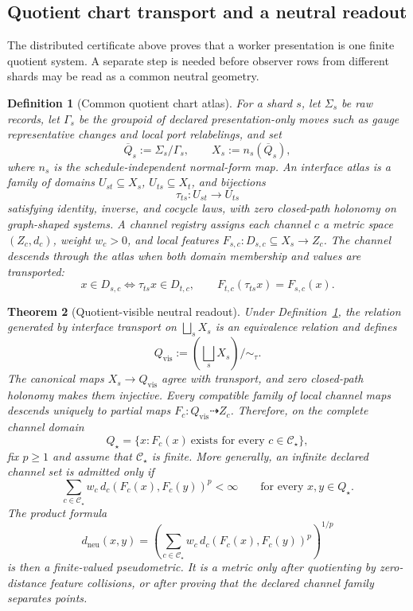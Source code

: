 \documentclass[11pt]{article}
\newtheorem{theorem}{Theorem}[section]
\newtheorem{definition}[theorem]{Definition}
\theoremstyle{remark}
\theoremstyle{plain}
\begin{document}
\subsection{Quotient chart transport and a neutral readout}
\label{sec:quotient-neutral-geometry}

The distributed certificate above proves that a worker presentation is one finite quotient
system. A separate step is needed before observer rows from different shards may be read as a
common neutral geometry.

\begin{definition}[Common quotient chart atlas]\label{def:neutral-quotient-atlas-consensus}
For a shard \(s\), let \(\Sigma_s\) be raw records, let \(\Gamma_s\) be the groupoid of declared
presentation-only moves such as gauge representative changes and local port relabelings, and set
\[
\overline Q_s:=\Sigma_s/\Gamma_s,\qquad X_s:=n_s(\overline Q_s),
\]
where \(n_s\) is the schedule-independent normal-form map. An interface atlas is a family of
domains \(U_{st}\subseteq X_s\), \(U_{ts}\subseteq X_t\), and bijections
\[
\tau_{ts}:U_{st}\to U_{ts}
\]
satisfying identity, inverse, and cocycle laws, with zero closed-path holonomy on graph-shaped
systems. A channel registry assigns each channel \(c\) a metric space \((Z_c,d_c)\), weight
\(w_c>0\), and local features \(F_{s,c}:D_{s,c}\subseteq X_s\to Z_c\). The channel descends
through the atlas when both domain membership and values are transported:
\[
x\in D_{s,c}\Longleftrightarrow \tau_{ts}x\in D_{t,c},
\qquad
F_{t,c}(\tau_{ts}x)=F_{s,c}(x).
\]
\end{definition}

\begin{theorem}[Quotient-visible neutral readout]\label{thm:neutral-quotient-readout-consensus}
Under Definition~\ref{def:neutral-quotient-atlas-consensus}, the relation generated by interface
transport on \(\bigsqcup_sX_s\) is an equivalence relation and defines
\[
Q_{\mathrm{vis}}:=\left(\bigsqcup_sX_s\right)/\!\sim_\tau .
\]
The canonical maps \(X_s\to Q_{\mathrm{vis}}\) agree with transport, and zero closed-path
holonomy makes them injective. Every compatible family of local channel maps descends uniquely
to partial maps \(F_c:Q_{\mathrm{vis}}\dashrightarrow Z_c\). Therefore, on the complete channel
domain
\[
Q_\star=\{x:F_c(x)\ \text{exists for every }c\in\mathcal C_\star\},
\]
fix \(p\ge1\) and assume that \(\mathcal C_\star\) is finite. More generally,
an infinite declared channel set is admitted only if
\[
\sum_{c\in\mathcal C_\star}
w_c\,d_c(F_c(x),F_c(y))^p<\infty
\qquad\text{for every }x,y\in Q_\star.
\]
The product formula
\[
d_{\mathrm{neu}}(x,y)
=
\left(\sum_{c\in\mathcal C_\star}w_c\,d_c(F_c(x),F_c(y))^p\right)^{1/p}
\]
is then a finite-valued pseudometric. It is a metric only after quotienting by zero-distance feature
collisions, or after proving that the declared channel family separates points.
\end{theorem}
\end{document}
